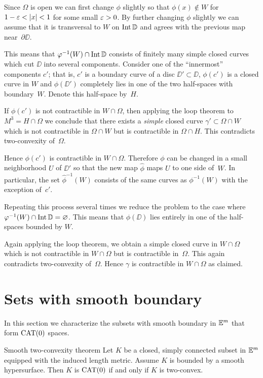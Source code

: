 Since $\Omega$ is open we can first change  $\phi$  slightly so that $\phi(x)\notin W$ for $1-\eps<|x|<1$ for some small $\varepsilon>0$.
By further changing $\phi$ slightly we can assume that it is transversal to $W$  on  $\operatorname{\rm Int}\nolimits \mathbb{D}$ and agrees with the previous map near~$\partial \DD$.


This means that $\varphi^{-1} (W)\cap \operatorname{\rm Int}\nolimits \mathbb{D}$ consists of finitely many simple closed curves which cut $\DD$ into several components. 
Consider one of the ``innermost'' components $c'$;
that is, $c'$ is a boundary curve of a disc $\DD'\subset \DD$,
$\phi(c')$ is a closed curve in $W$ and $\phi(\DD')$  completely lies in one of the two half-spaces  with boundary~$W$. 
Denote this half-space by~$H$.

If $\phi(c')$ is not contractible in $W\cap \Omega$, then applying the loop theorem to $M^3=H\cap \Omega$ we conclude that  there exists a \emph{simple} closed curve $\gamma'\subset \Omega\cap W$ which is not contractible in $\Omega\cap W$ but is contractible in $\Omega\cap H$. 
This contradicts two-convexity of~$\Omega$. 

Hence $\phi(c')$ is contractible in $W\cap \Omega$. Therefore $\phi$ can be changed in a small neighborhood $U$ of $\DD'$ so that the new map $\hat\phi$ maps $U$ to one side of~$W$. 
In particular, the set $\hat\phi^{-1}(W)$ consists of the same curves as $\phi^{-1} (W)$ with the exception of~$c'$.

Repeating this process several times we reduce the problem to the case where $\varphi^{-1} (W)\cap \operatorname{\rm Int}\nolimits \mathbb{D}=\varnothing$.
This means that $\phi(\DD)$ lies entirely in one of the half-spaces bounded by $W$.

Again applying the loop theorem, we obtain a simple closed curve in $W\cap \Omega$ which is not contractible in $W\cap \Omega$ but is contractible in~$\Omega$. 
This again contradicts two-convexity of~$\Omega$. 
Hence $\gamma$ is contractible in  $W\cap \Omega$ as claimed.
\qeds




\section{Sets with smooth boundary}\label{sec:smooth-bry}

In this section we characterize the subsets with smooth boundary in $\mathbb{E}^m$  that form $\mathrm{CAT}(0)$ spaces. 


\begin{thm}{Smooth two-convexity theorem}\label{thm:set-with-smooth-bry:CBA}
Let $K$ be a closed, simply connected subset in $\mathbb{E}^m$ equipped with the induced length metric.
Assume $K$ is bounded by a smooth hypersurface.
Then 
$K$ is $\mathrm{CAT}(0)$ if and only if $K$ is two-convex.
\end{thm}


